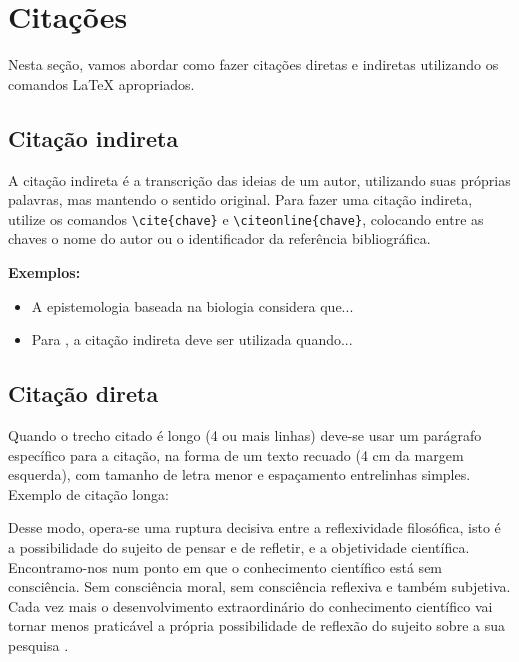 \section{Citações}
\label{sec:citacoes}

Nesta seção, vamos abordar como fazer citações diretas e indiretas utilizando os comandos \LaTeX{} apropriados.

\subsection{Citação indireta}
\label{subsec:citacaoIndireta}

A citação indireta é a transcrição das ideias de um autor, utilizando suas próprias palavras, mas mantendo o sentido original. Para fazer uma citação indireta, utilize os comandos \verb|\cite{chave}| e \verb|\citeonline{chave}|, colocando entre as chaves o nome do autor ou o identificador da referência bibliográfica.

\textbf{Exemplos:}
\begin{itemize}
\item A epistemologia baseada na biologia considera que... \cite{Maturana2003}
\item Para , a citação indireta deve ser utilizada quando...
\end{itemize}

\subsection{Citação direta}
\label{subsec:citacaoDireta}

Quando o trecho citado é longo (4 ou mais linhas) deve-se usar um parágrafo específico para a citação, na forma de um texto recuado (4 cm da margem esquerda), com tamanho de letra menor e espaçamento entrelinhas simples. Exemplo de citação longa:
\\
\begin{citacao}
    Desse modo, opera-se uma ruptura decisiva entre a reflexividade filosófica, isto é a possibilidade do sujeito de pensar e de refletir, e a objetividade científica. Encontramo-nos num ponto em que o conhecimento científico está sem consciência. Sem consciência moral, sem consciência reflexiva e também subjetiva. Cada vez mais o desenvolvimento extraordinário do conhecimento científico vai tornar menos praticável a própria possibilidade de reflexão do sujeito sobre a sua pesquisa \cite[p.~28]{Silva2000}.
\end{citacao}

